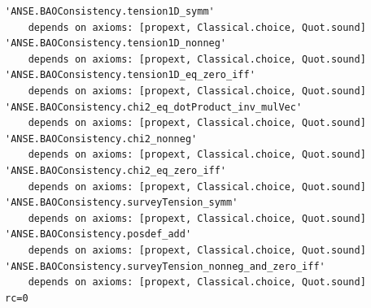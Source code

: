 \begin{verbatim}
'ANSE.BAOConsistency.tension1D_symm'
    depends on axioms: [propext, Classical.choice, Quot.sound]
'ANSE.BAOConsistency.tension1D_nonneg'
    depends on axioms: [propext, Classical.choice, Quot.sound]
'ANSE.BAOConsistency.tension1D_eq_zero_iff'
    depends on axioms: [propext, Classical.choice, Quot.sound]
'ANSE.BAOConsistency.chi2_eq_dotProduct_inv_mulVec'
    depends on axioms: [propext, Classical.choice, Quot.sound]
'ANSE.BAOConsistency.chi2_nonneg'
    depends on axioms: [propext, Classical.choice, Quot.sound]
'ANSE.BAOConsistency.chi2_eq_zero_iff'
    depends on axioms: [propext, Classical.choice, Quot.sound]
'ANSE.BAOConsistency.surveyTension_symm'
    depends on axioms: [propext, Classical.choice, Quot.sound]
'ANSE.BAOConsistency.posdef_add'
    depends on axioms: [propext, Classical.choice, Quot.sound]
'ANSE.BAOConsistency.surveyTension_nonneg_and_zero_iff'
    depends on axioms: [propext, Classical.choice, Quot.sound]
rc=0
\end{verbatim}
